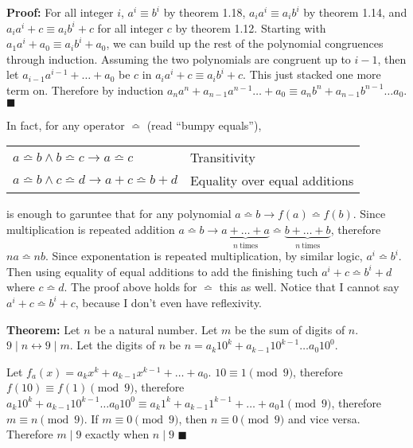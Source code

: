 \textbf{Proof:} For all integer \(i\), \(a^i \equiv b^i\) by theorem 1.18, \(a_i a^i \equiv a_i b^i\) by theorem 1.14, and \(a_i a^i + c \equiv a_i b^i + c\) for all integer \(c\) by theorem 1.12. Starting with \(a_1 a^i + a_0 \equiv a_i b^i + a_0\), we can build up the rest of the polynomial congruences through induction. Assuming the two polynomials are congruent up to \(i-1\), then let \(a_{i-1} a^{i-1} + \dots + a_0\) be \(c\) in \(a_i a^i + c \equiv a_i b^i + c\). This just stacked one more term on. Therefore by induction \(a_n a^n + a_{n-1} a^{n-1} \dots + a_0 \equiv a_n b^n + a_{n-1} b^{n-1} \dots a_0\).{\tiny $\blacksquare$}

In fact, for any operator \(\bumpeq\) (read ``bumpy equals''), 

\begin{tabular}{ll}
\(a \bumpeq b \wedge b \bumpeq c \rightarrow a \bumpeq c\) & Transitivity \\
\(a \bumpeq b \wedge c \bumpeq d \rightarrow a + c \bumpeq b + d\) & Equality over equal additions \\
\end{tabular}

is enough to garuntee that for any polynomial \(a \bumpeq b \rightarrow f(a) \bumpeq f(b)\). Since multiplication is repeated addition \(a \bumpeq b \rightarrow \underbrace{a + \dots + a}_{n\ \text{times}} \bumpeq \underbrace{b + \dots + b}_{n\ \text{times}}\), therefore \(na \bumpeq nb\). Since exponentation is repeated multiplication, by similar logic, \(a^i \bumpeq b^i\). Then using equality of equal additions to add the finishing tuch \(a^i + c \bumpeq b^i + d\) where \(c \bumpeq d\). The proof above holds for \(\bumpeq\)  this as well. Notice that I cannot say \(a^i + c \bumpeq b^i + c\), because I don't even have reflexivity.

\item \textbf{Theorem:} Let \(n\) be a natural number. Let \(m\) be the sum of digits of \(n\). \(9 \mid n \leftrightarrow 9 \mid m\). Let the digits of \(n\) be \(n = a_k 10^k + a_{k-1} 10^{k-1} \dots a_0 10^0\).

Let \(f_a(x) = a_k x^k + a_{k-1} x^{k-1} + \dots + a_0\). \(10 \equiv 1 \pmod 9\), therefore \(f(10) \equiv f(1) \pmod 9\), therefore \(a_k 10^k + a_{k-1} 10^{k-1} \dots a_0 10^0 \equiv a_k 1^k + a_{k-1} 1^{k-1} + \dots + a_0 1 \pmod 9\), therefore \(m \equiv n \pmod 9\). If \(m \equiv 0 \pmod 9\), then \(n \equiv 0 \pmod 9\) and vice versa. Therefore \(m \mid 9\) exactly when \(n \mid 9\) {\tiny \(\blacksquare\)}

